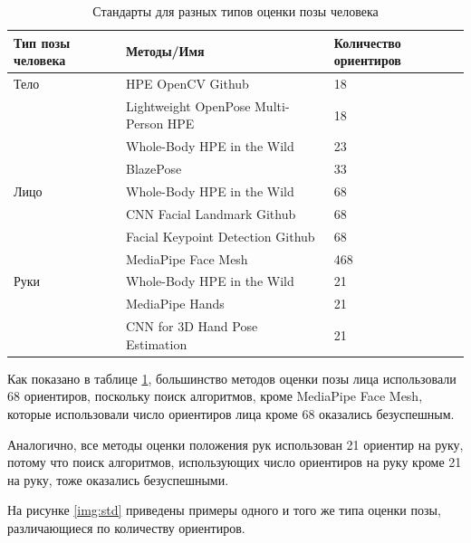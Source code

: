 \begin{table}[ht!]
	\centering
	\caption{Стандарты для разных типов оценки позы человека}
	\label{table:standart}
	\begin{tabular}{|p{3.3cm}|p{9.0cm}|p{2.8cm}|}
		\hline
		\textbf{Тип позы человека} & \textbf{Методы/Имя} & \textbf{Количество ориентиров} \\
		\hline
		Тело  & HPE OpenCV Github \cite{OpenCV-HPE}   &  18 \\
		\cline{2 - 3}  & Lightweight OpenPose Multi-Person HPE \cite{osokin2018lightweight_openpose}    & 18 \\
		\cline{2 - 3}  & Whole-Body HPE in the Wild \cite{jin2020whole}    & 23 \\
		\cline{2 - 3}  & BlazePose \cite{BlazePoese}    & 33 \\
		\hline
		
		Лицо  & Whole-Body HPE in the Wild \cite{jin2020whole}     &  68 \\
		\cline{2 - 3}  & CNN Facial Landmark Github \cite{cnn-facial-landmark}    & 68 \\
		\cline{2 - 3}  & Facial Keypoint Detection Github \cite{Facial-Keypoint-Detection-Udacity-PPB}    & 68 \\
		\cline{2 - 3}  & MediaPipe Face Mesh \cite{mediapipe}    & 468 \\
		\hline
		
		Руки  & Whole-Body HPE in the Wild \cite{jin2020whole}     &  21 \\
		\cline{2 - 3}  & MediaPipe Hands \cite{mediapipe}    & 21 \\
		\cline{2 - 3}  & CNN for 3D Hand Pose Estimation\cite{hierarchiacal}    & 21 \\
		\hline

	\end{tabular}
\end{table}


Как показано в таблице \ref{table:standart}, большинство методов оценки позы лица использовали 68 ориентиров, поскольку поиск алгоритмов, кроме MediaPipe Face Mesh, которые использовали число ориентиров лица кроме 68 оказались безуспешным.

Аналогично, все методы оценки положения рук использован 21 ориентир на руку, потому что поиск алгоритмов, использующих число ориентиров на руку кроме 21 на руку, тоже оказались безуспешными. 

На рисунке \ref{img:std} приведены примеры одного и того же типа оценки позы, различающиеся по количеству ориентиров.

